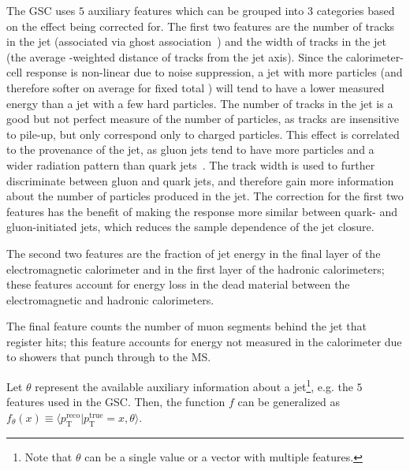 The GSC uses $5$ auxiliary features which can be grouped into $3$ categories based on the effect being corrected for.
The first two features are the number of tracks in the jet (associated via ghost association~\cite{Cacciari:2008gn}) and the width of tracks in the jet (the average \pt-weighted distance of tracks from the jet axis).
Since the calorimeter-cell response is non-linear due to noise suppression, a jet with more particles (and therefore softer on average for fixed total \pt{}) will tend to have a lower measured energy than a jet with a few hard particles.
The number of tracks in the jet is a good but not perfect measure of the number of particles, as tracks are insensitive to pile-up, but only correspond only to charged particles.
This effect is correlated to the provenance of the jet, as gluon jets tend to have more particles and a wider radiation pattern than quark jets~\cite{Salam:2009jx}.
The track width is used to further discriminate between gluon and quark jets, and therefore gain more information about the number of particles produced in the jet.
The correction for the first two features has the benefit of making the response more similar between quark- and gluon-initiated jets, which reduces the sample dependence of the jet \pt{} closure.

The second two features are the fraction of jet energy in the final layer of the electromagnetic calorimeter and in the first layer of the hadronic calorimeters; these features account for energy loss in the dead material between the electromagnetic and hadronic calorimeters.

The final feature counts the number of muon segments behind the jet that register hits; this feature accounts for energy not measured in the calorimeter due to showers that punch through to the MS.


Let $\theta$ represent the available auxiliary information about a jet\footnote{Note that $\theta$ can be a single value or a vector with multiple features.}, e.g. the $5$ features used in the GSC.
Then, the function $f$ can be generalized as $f_\theta(x)\equiv \langle p_\text{T}^\text{reco}|p_\text{T}^\text{true}=x,\theta\rangle$.


